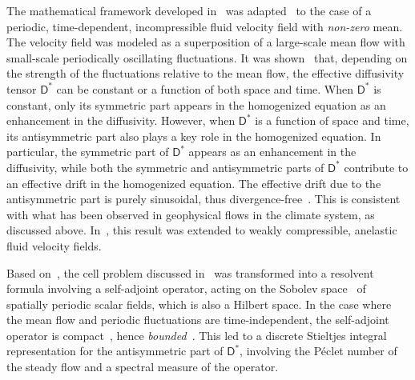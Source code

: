 \documentclass[leqno,onefignum,onetabnum]{siamltex1213}
\newcommand{\Dm}{\mathsf{D}}
\begin{document}
The mathematical framework developed in~\cite{McLaughlin:SIAM_JAM:780}
was
adapted~\cite{Pavliotis:PHD_Thesis,McLaughlin:Forest:PF:1999:880,Majda:Kramer:1999:book} 
to the case of a periodic, 
time-dependent, incompressible fluid velocity field with \emph{non-zero}
mean. The velocity field was modeled as a superposition of a
large-scale mean flow with small-scale periodically oscillating 
fluctuations. It was shown~\cite{Pavliotis:PHD_Thesis} that, depending
on the strength of the fluctuations relative to the mean flow, the
effective diffusivity tensor $\Dm^*$ can be constant or a function of
both space and time. When $\Dm^*$ is constant, only its symmetric part
appears in the homogenized equation as an enhancement in the
diffusivity. However, when $\Dm^*$ is a function of space and time,
its antisymmetric part also plays a key role in the homogenized
equation. In particular, the symmetric part of $\Dm^*$ appears as an
enhancement in the diffusivity, while both the symmetric and
antisymmetric parts of $\Dm^*$ contribute to an effective drift in the
homogenized equation. The effective drift due to the antisymmetric
part is purely sinusoidal, thus
divergence-free~\cite{Pavliotis:PHD_Thesis}. This is consistent with
what has been observed in geophysical flows in the climate system, as
discussed above. In~\cite{McLaughlin:Forest:PF:1999:880}, this result
was extended to weakly compressible, anelastic fluid velocity fields.



Based on~\cite{Bhattacharya:AAP:1999:951}, the cell problem discussed
in~\cite{Pavliotis:PHD_Thesis} was transformed into a resolvent formula
involving a self-adjoint operator, acting on the Sobolev
space~\cite{McOwen:2003:PDE,Folland:95:PDEs} of spatially periodic scalar
fields, which is also a Hilbert space. In the case where the mean flow
and periodic fluctuations are time-independent, the
self-adjoint operator is compact~\cite{Bhattacharya:AAP:1999:951},
hence \emph{bounded}~\cite{Stakgold:BVP:2000}. This led to a
discrete Stieltjes integral representation for the
antisymmetric part of $\Dm^*$, involving the P\'{e}clet number of the
steady flow and a spectral measure of the operator.    
\end{document}
